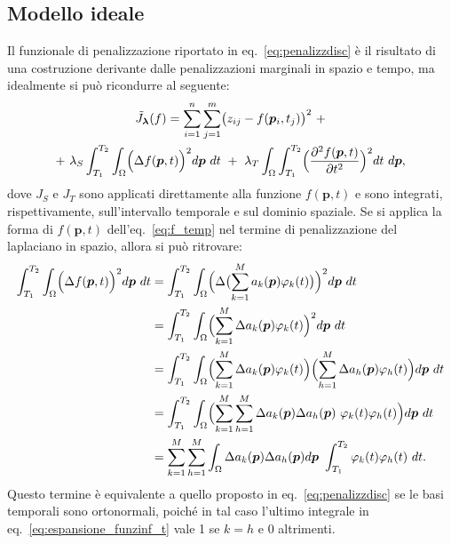 \documentclass[a4paper,11pt,twoside,openright]{book}							%
\begin{document}
\subsection{Modello ideale}
Il funzionale di penalizzazione riportato in eq.~\eqref{eq:penalizzdisc} è il risultato di una costruzione derivante dalle penalizzazioni marginali in spazio e tempo, ma idealmente si può ricondurre al seguente:
\begin{multline}
\label{eq:Jfunc_cont}
\tilde J_{\bm \lambda }(f) = \sum_{i=1}^n \sum_{j=1}^m \bigl( z_{ij} - f(\bm p_i,t_j) \bigr)^2 \ + \\+\   \lambda_S \int_{T_1}^{T_2} \int_\Omega \Bigl( \Delta f(\bm p, t)  \Bigr)^2 d\bm p\ dt \ +\  \lambda_T \int_\Omega \int_{T_1}^{T_2} \Bigl( \frac{\partial^2 f(\bm p, t) }{\partial t ^2} \Bigr)^2 dt\ d\bm p ,
\end{multline}
dove $J_S$ e $J_T$ sono applicati direttamente alla funzione $f(\bm p, t)$ e sono integrati, rispettivamente, sull'intervallo temporale e sul dominio spaziale. Se si applica la forma di $f(\bm p,t)$ dell'eq.~\eqref{eq:f_temp} nel termine di penalizzazione del laplaciano in spazio, allora si può ritrovare:
\begin{equation} 
\label{eq:espansione_funzinf_t}
\begin{split}
\int_{T_1}^{T_2} \int_\Omega \Bigl( \Delta f(\bm p, t)  \Bigr)^2 d\bm p\ dt 
&=\int_{T_1}^{T_2} \int_\Omega \Bigl( \Delta \bigl( \sum_{k=1}^M a_k(\bm p) \varphi_k(t) \bigr)  \Bigr)^2 d\bm p\ dt \\
&=\int_{T_1}^{T_2} \int_\Omega \Bigl( \sum_{k=1}^M \Delta a_k(\bm p) \varphi_k(t)  \Bigr)^2 d\bm p\ dt \\
&=\int_{T_1}^{T_2} \int_\Omega \Bigl( \sum_{k=1}^M \Delta a_k(\bm p) \varphi_k(t)  \Bigr)\Bigl( \sum_{h=1}^M \Delta a_h(\bm p) \varphi_h(t)  \Bigr) d\bm p\ dt \\
&=\int_{T_1}^{T_2} \int_\Omega \Bigl( \sum_{k=1}^M \sum_{h=1}^M \Delta a_k(\bm p)\Delta a_h(\bm p)\ \varphi_k(t)  \varphi_h(t)  \Bigr) d\bm p\ dt \\
&=\sum_{k=1}^M \sum_{h=1}^M \int_\Omega   \Delta a_k(\bm p) \Delta a_h(\bm p)d\bm p \ \int_{T_1}^{T_2} \varphi_k(t)\varphi_h(t)   \ dt .
\end{split}
\end{equation}
Questo termine è equivalente a quello proposto in eq.~\eqref{eq:penalizzdisc} se le basi temporali sono ortonormali, poiché in tal caso l'ultimo integrale in eq.~\eqref{eq:espansione_funzinf_t} vale 1 se $k=h$ e 0 altrimenti.
\end{document}
